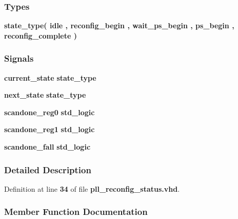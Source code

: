 \subsubsection*{Types}
 \begin{DoxyCompactItemize}
\item 
{\bfseries {\bf state\+\_\+type}{\bfseries \textcolor{vhdlchar}{(}\textcolor{vhdlchar}{ }\textcolor{vhdlchar}{idle}\textcolor{vhdlchar}{ }\textcolor{vhdlchar}{,}\textcolor{vhdlchar}{ }\textcolor{vhdlchar}{reconfig\+\_\+begin}\textcolor{vhdlchar}{ }\textcolor{vhdlchar}{,}\textcolor{vhdlchar}{ }\textcolor{vhdlchar}{wait\+\_\+ps\+\_\+begin}\textcolor{vhdlchar}{ }\textcolor{vhdlchar}{,}\textcolor{vhdlchar}{ }\textcolor{vhdlchar}{ps\+\_\+begin}\textcolor{vhdlchar}{ }\textcolor{vhdlchar}{,}\textcolor{vhdlchar}{ }\textcolor{vhdlchar}{reconfig\+\_\+complete}\textcolor{vhdlchar}{ }\textcolor{vhdlchar}{)}\textcolor{vhdlchar}{ }}} 
\end{DoxyCompactItemize}
\subsubsection*{Signals}
 \begin{DoxyCompactItemize}
\item 
{\bf current\+\_\+state} {\bfseries {\bfseries {\bf state\+\_\+type}} \textcolor{vhdlchar}{ }} 
\item 
{\bf next\+\_\+state} {\bfseries {\bfseries {\bf state\+\_\+type}} \textcolor{vhdlchar}{ }} 
\item 
{\bf scandone\+\_\+reg0} {\bfseries \textcolor{comment}{std\+\_\+logic}\textcolor{vhdlchar}{ }} 
\item 
{\bf scandone\+\_\+reg1} {\bfseries \textcolor{comment}{std\+\_\+logic}\textcolor{vhdlchar}{ }} 
\item 
{\bf scandone\+\_\+fall} {\bfseries \textcolor{comment}{std\+\_\+logic}\textcolor{vhdlchar}{ }} 
\end{DoxyCompactItemize}


\subsubsection{Detailed Description}


Definition at line {\bf 34} of file {\bf pll\+\_\+reconfig\+\_\+status.\+vhd}.



\subsubsection{Member Function Documentation}

